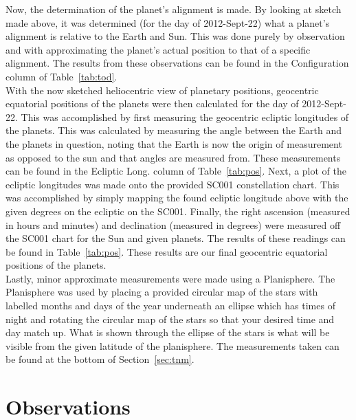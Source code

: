 \documentclass{article}
\begin{document}
Now, the determination of the planet's alignment is made. By looking at sketch made above, it was determined (for the day of
2012-Sept-22) what a planet's alignment is relative to the Earth and Sun. This was done purely by observation and with 
approximating the planet's actual position to that of a specific alignment. The results from these observations can be found
in the Configuration column of Table~\ref{tab:tod}.\\

With the now sketched heliocentric view of planetary positions, geocentric equatorial positions of the planets were then
calculated for the day of 2012-Sept-22. This was accomplished by first measuring the geocentric ecliptic longitudes of the planets.
This was calculated by measuring the angle between the Earth and the planets in question, noting that the Earth is now the origin 
of measurement as opposed to the sun and that angles are measured from. These measurements can be found in the 
Ecliptic Long. column of Table~\ref{tab:pos}. Next, a plot of the ecliptic longitudes was made onto the provided SC001
constellation chart. This was accomplished by simply mapping the found ecliptic longitude above with the given degrees on
the ecliptic on the SC001. Finally, the right ascension (measured in hours and minutes) and declination (measured in degrees)
were measured off the SC001 chart for the Sun and given planets. The results of these readings can be found in Table~\ref{tab:pos}.
These results are our final geocentric equatorial positions of the planets.\\

Lastly, minor approximate measurements were made using a Planisphere. The Planisphere was used by placing a provided circular
map of the stars with labelled months and days of the year underneath an ellipse which has times of night and rotating the 
circular map of the stars so that your desired time and day match up. What is shown through the ellipse of the stars is what will 
be visible from the given latitude of the planisphere. The measurements taken can be found at the bottom of 
Section~\ref{sec:tnm}.\\



\section{Observations}
\end{document}
